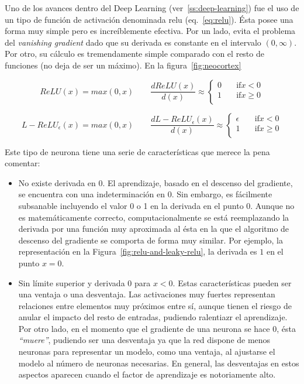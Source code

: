 Uno de los avances dentro del Deep Learning (ver~\ref{ss:deep-learning}) fue el uso de un tipo de función de activación denominada \acrfull{relu} (eq.~\ref{eq:relu}). Ésta posee una forma muy simple pero es increíblemente efectiva. Por un lado, evita el problema del \textit{vanishing gradient} dado que su derivada es constante en el intervalo $(0, \infty)$. Por otro, su cálculo es tremendamente simple comparado con el resto de funciones (no deja de ser un máximo). En la figura~\ref{fig:neocortex}

\begin{equation}
	ReLU(x) = max(0, x) \qquad
	\frac{d ReLU(x)}{d(x)} \approx
	\begin{cases}
		0 &\quad\text{if} x < 0 \\
		1 &\quad\text{if} x \geq 0 \\
	\end{cases}
	\label{eq:relu}
\end{equation}

\begin{equation}
	L-ReLU_\epsilon(x) = max(0, x) \qquad
	\frac{d L-ReLU_\epsilon(x)}{d(x)} \approx
	\begin{cases}
	\epsilon &\quad\text{if} x < 0 \\
	1 &\quad\text{if} x \geq 0 \\
	\end{cases}
	\label{eq:leaky-relu}
\end{equation}

Este tipo de neurona tiene una serie de características que merece la pena comentar:

\begin{itemize}
	\item No existe derivada en $0$. El aprendizaje, basado en el descenso del gradiente, se encuentra con una indeterminación en $0$. Sin embargo, es fácilmente subsanable incluyendo el valor 0 o 1 en la derivada en el punto 0. Aunque no es  matemáticamente correcto, computacionalmente se está reemplazando la derivada por una función muy aproximada al ésta en la que el algoritmo de descenso del gradiente se comporta de forma muy similar. Por ejemplo, la representación en la Figura~\ref{fig:relu-and-leaky-relu}, la derivada es $1$ en el punto $x = 0$.
	\item Sin límite superior y derivada $0$ para $x < 0$. Estas características pueden ser una ventaja o una desventaja. Las activaciones muy fuertes representan relaciones entre elementos muy próximos entre sí, aunque tienen el riesgo de anular el impacto del resto de entradas, pudiendo ralentiazr el aprendizaje. Por otro lado, en el momento que el gradiente de una neurona se hace 0, ésta \textit{\enquote{muere}}, pudiendo ser una desventaja ya que la red dispone de menos neuronas para representar un modelo, como una ventaja, al ajustarse el modelo al número de neuronas necesarias. En general, las desventajas en estos aspectos aparecen cuando el factor de aprendizaje es notoriamente alto.
\end{itemize}

